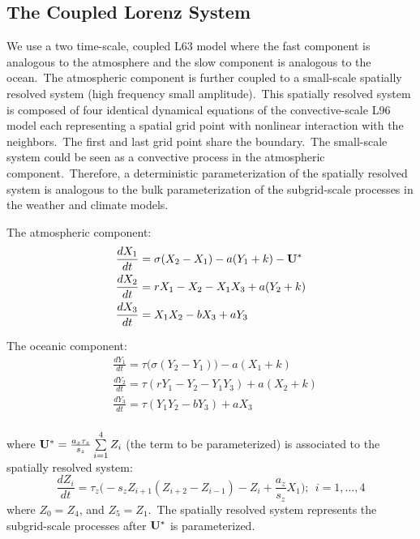 	\subsection{The Coupled Lorenz System} 
		We use a two time-scale, coupled L63 model 
		{\citep{Lorenz63, Siqueira12}} where the fast component is analogous 
		to the atmosphere and the slow component is analogous to the ocean.\
		The atmospheric component is further coupled 
		to a small-scale spatially resolved system
		(high frequency small amplitude).\
		This spatially resolved system is composed of four
		identical dynamical equations of the convective-scale L96 model {\citep{Lorenz96}}
		each representing a spatial grid point with nonlinear 
		interaction with the neighbors.\
		The first and last grid point share the boundary.\
		The small-scale system could be seen
		as a convective process in the atmospheric component.\
		Therefore, a deterministic parameterization of the spatially resolved system
		is analogous to the bulk parameterization of the 
		subgrid-scale processes in the weather and climate models.\
		
		The atmospheric component:
		\begin{equation} \label{atmComp}
			\begin{aligned}
				&\frac{dX_1}{dt} = \sigma(X_2 - X_1) - a(Y_1 + k) - {\bold{U^*}} \\%
				&\frac{dX_2}{dt} = rX_1 - X_2 - X_1 X_3 + a(Y_2 + k) \\
				&\frac{dX_3}{dt} = X_1 X_2 - bX_3 + aY_3 \\
			\end{aligned}
		\end{equation}
		
		The oceanic component:
		\begin{equation} \label{ocnComp}
			\begin{aligned}
				&\frac{dY_1}{dt} = \tau \Big(\sigma(Y_2 - Y_1)\Big) - a(X_1 + k) \\
				&\frac{dY_2}{dt} = \tau(rY_1 - Y_2 - Y_1 Y_3) + a(X_2 + k) \\
				&\frac{dY_3}{dt} = \tau(Y_1 Y_2 - bY_3) + aX_3 \\
			\end{aligned}
		\end{equation}
		
		where $\bold{U^*} = \frac{a_z\tau_z}{s_z}\sum\limits_{i=1}^4 Z_i$ 
		(the term to be parameterized) 
		is associated to the spatially resolved system:
		\begin{equation} \label{subgridComp}
			\frac{dZ_i}{dt} = \tau_z \Big( -s_z Z_{i+1} (Z_{i+2} - Z_{i-1}) 
				- Z_i  + \frac{a_z}{s_z}X_1 \Big); \ \ i = 1,\dotsc,4 
		\end{equation}
		where $Z_0 = Z_4$, and $Z_5 = Z_1$.\ 
		The spatially resolved system represents the subgrid-scale processes
		after $\bold{U^*}$ is parameterized.\ 


